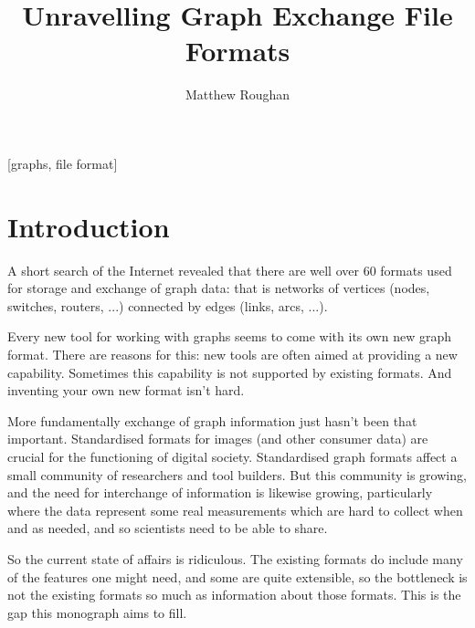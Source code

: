 \documentclass{sig-alternate}
\begin{document}
\conferenceinfo{}{}
\title{Unravelling Graph Exchange File Formats
}
\author{Matthew Roughan}
\maketitle
\begin{abstract}
  
\end{abstract}
[graphs, file format]


\nocite{ebert99:_grax,holt06:_gxl,herman02:_graph_drawin,batagelj95:_towar_netml,Kienle:rigi,}

\section{Introduction}

A short search of the Internet revealed that there are well over 60
formats used for storage and exchange of graph data: that is networks
of vertices (nodes, switches, routers, ...) connected by edges (links,
arcs, ...). 

Every new tool for working with graphs seems to come with its own new
graph format. There are reasons for this: new tools are often aimed at
providing a new capability. Sometimes this capability is not supported
by existing formats. And inventing your own new format isn't hard. 

More fundamentally exchange of graph information just hasn't been that
important. Standardised formats for images (and other consumer data)
are crucial for the functioning of digital society. Standardised graph
formats affect a small community of researchers and tool builders. But
this community is growing, and the need for interchange of information
is likewise growing, particularly where the data represent some real
measurements which are hard to collect when and as needed, and so
scientists need to be able to share.

So the current state of affairs is ridiculous. The existing formats do
include many of the features one might need, and some are quite
extensible, so the bottleneck is not the existing formats so much as
information about those formats. This is the gap this monograph aims
to fill.
\end{document}
